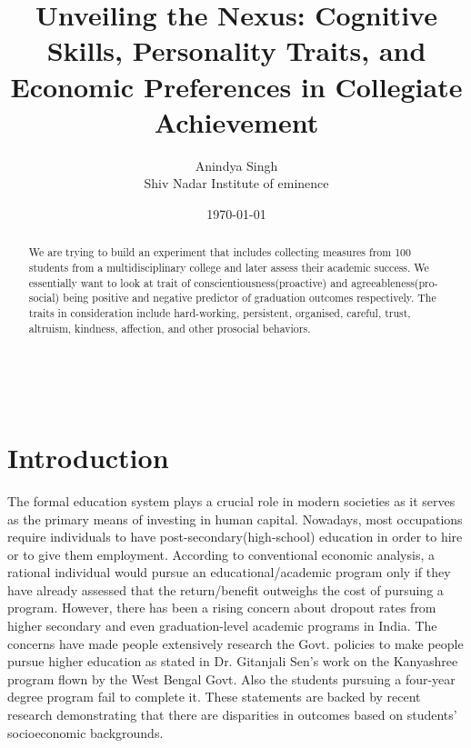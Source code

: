 \documentclass[12pt,a4paper]{article}
\begin{document}
\title{Unveiling the Nexus: Cognitive Skills, Personality Traits, and Economic Preferences in Collegiate Achievement}
\maketitle
\setcounter{page}{0}

\centering

\vspace*{\fill}

{\author{Anindya Singh \\ \large Shiv Nadar Institute of eminence}\\
\date{\today}

\vspace{1cm}



\vspace*{\fill}
\newpage
\tableofcontents
\newpage
\begin{abstract}

    We are trying to build an experiment that includes collecting measures from 100 students from a multidisciplinary college and later assess their academic success. We essentially want to look at trait of conscientiousness(proactive) and agreeableness(pro-social) being positive and negative predictor of graduation outcomes respectively. The traits in consideration include hard-working, persistent, organised, careful, trust, altruism, kindness, affection, and other prosocial behaviors.

\end{abstract}
\newpage
\section{Introduction}
\justifying The formal education system plays a crucial role in modern societies as it serves as the primary means of investing in human capital. Nowadays, most occupations require individuals to have post-secondary(high-school) education in order to hire or to give them employment. According to conventional economic analysis, a rational individual would pursue an educational/academic program only if they have already assessed that the return/benefit outweighs the cost of pursuing a program. However, there has been a rising concern about dropout rates from higher secondary and even graduation-level academic programs in India. \cite{article} The concerns have made people extensively research the Govt. policies to make people pursue higher education as stated in Dr. Gitanjali Sen's work on the Kanyashree program flown by the West Bengal Govt. \cite{unknown} Also the students pursuing a four-year degree program fail to complete it. These statements are backed by recent research demonstrating that there are disparities in outcomes based on students' socioeconomic backgrounds. \cite{Gitanjali} \cite{article2}

}
\end{document}
